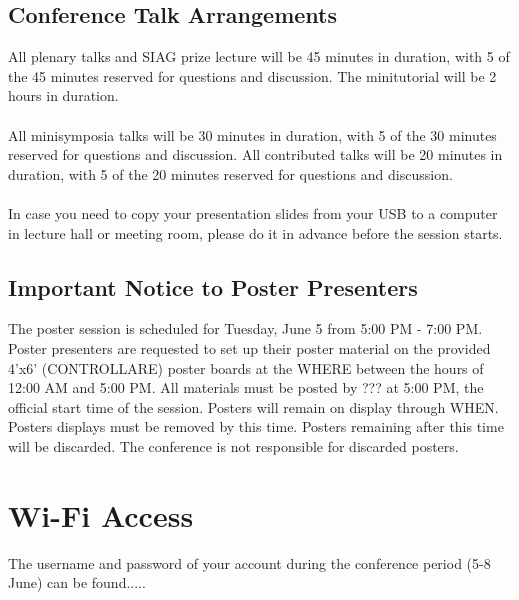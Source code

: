 \begin{multicols}{2}
\subsection*{Conference Talk Arrangements}
All plenary talks and SIAG prize lecture will be 45 minutes in duration,
with 5 of the 45 minutes reserved for questions and discussion.
The minitutorial will be 2 hours in duration.\\\\
All minisymposia talks will be 30 minutes in duration, with 5 of the 30
minutes reserved for questions and discussion.
All contributed talks will be 20 minutes in duration, with 5 of the 20
minutes reserved for questions and discussion.\\\\
In case you need to copy your presentation slides from your USB to a
computer in lecture hall or meeting room, please do it in advance before
the session starts.
\subsection*{Important Notice to Poster Presenters}
The poster session is scheduled for
Tuesday, June 5 from 5:00 PM - 7:00 PM. Poster
presenters are requested to set up
their poster material on the provided
4'x6' (CONTROLLARE) poster boards at the WHERE between the hours of 12:00 AM and 5:00 PM. 
All materials must
be posted by ??? at
5:00 PM, the official start time of
the session. Posters will remain on display through WHEN.
Posters displays must be removed by this time. Posters remaining after this time will be discarded.
The conference is not responsible for
discarded posters.
\section*{Wi-Fi Access}
The username and password of your account during the conference period (5-8 June) can be found.....

\end{multicols}
